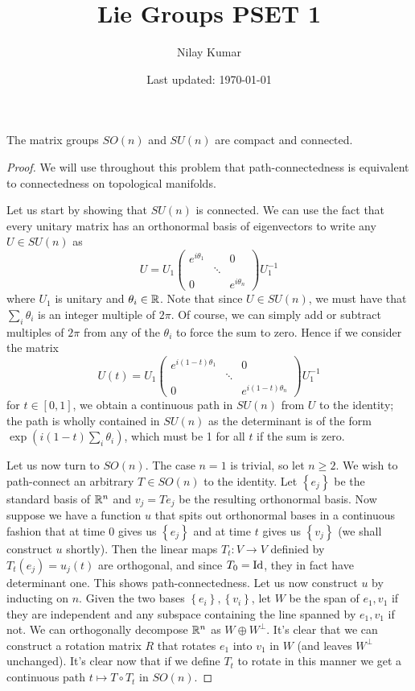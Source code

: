 \documentclass{../../mathnotes}
\title{Lie Groups PSET 1}
\author{Nilay Kumar}
\date{Last updated: \today}
\begin{document}
\maketitle

\begin{prop}
    The matrix groups $SO(n)$ and $SU(n)$ are compact and connected.
\end{prop}
\begin{proof}
    We will use throughout this problem that path-connectedness is equivalent to connectedness on topological manifolds.

    Let us start by showing that $SU(n)$ is connected. We can use the fact that every unitary matrix has an orthonormal basis of eigenvectors
    to write any $U\in SU(n)$ as
    \[
        U=U_1\begin{pmatrix}e^{i\theta_1} & & 0\\&\ddots&\\0&&e^{i\theta_n}\end{pmatrix}U_1^{-1}    
    \]
    where $U_1$ is unitary and $\theta_i\in\mathbb{R}$. Note that since $U\in SU(n)$, we must have that $\sum_i\theta_i$ is an integer multiple of
    $2\pi$. Of course, we can simply add or subtract multiples of $2\pi$ from any of the $\theta_i$ to force the sum to zero. Hence if we consider the matrix
    \[
        U(t)=U_1\begin{pmatrix}e^{i(1-t)\theta_1} & & 0\\&\ddots&\\0&&e^{i(1-t)\theta_n}\end{pmatrix}U_1^{-1}
    \]
    for $t\in[0,1]$, we obtain a continuous path in $SU(n)$ from $U$ to the identity; the path is wholly contained in $SU(n)$ as the determinant
    is of the form $\exp(i(1-t)\sum_i\theta_i)$, which must be 1 for all $t$ if the sum is zero.

    Let us now turn to $SO(n)$. The case $n=1$ is trivial, so let $n\geq 2$. We wish to path-connect an arbitrary $T\in SO(n)$ to the identity.
    Let $\left\{ e_j \right\}$ be the standard basis of $\mathbb{R}^n$ and $v_j=Te_j$ be the resulting orthonormal basis.
    Now suppose we have a function $u$ that spits out orthonormal bases in a continuous fashion that at time 0 gives us $\left\{ e_j \right\}$ and
    at time $t$ gives us $\left\{ v_j \right\}$ (we shall construct $u$ shortly). Then the linear maps $T_t:V\to V$ definied by $T_t(e_j)=u_j(t)$
    are orthogonal, and since $T_0=\operatorname{Id}$, they in fact have determinant one. This shows path-connectedness. Let us now construct $u$ by inducting on $n$.
    Given the two bases $\left\{ e_i \right\},\left\{ v_i \right\}$, let $W$ be the span of $e_1,v_1$ if they are independent and any subspace
    containing the line spanned by $e_1,v_1$ if not. We can orthogonally decompose $\mathbb{R}^n$ as $W\oplus W^\perp$. It's clear that we can construct a
    rotation matrix $R$ that rotates $e_1$ into $v_1$ in $W$ (and leaves $W^\perp$ unchanged). It's clear now that if we define $T_t$ to rotate in this manner
    we get a continuous path $t\mapsto T\circ T_t$ in $SO(n)$.


\end{proof}
\end{document}
